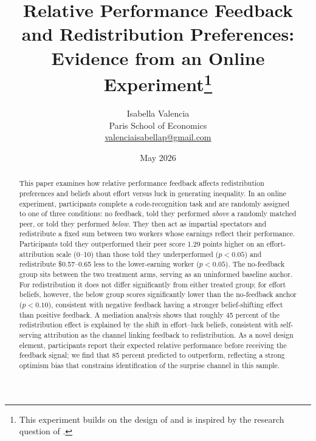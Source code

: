 \documentclass[12pt]{article}
\begin{document}
\title{\textbf{Relative Performance Feedback and Redistribution Preferences:
Evidence from an Online Experiment}\thanks{
This experiment builds on the design of \citet{Almas2020} and is inspired
by the research question of \citet{Cassar2019}.}}

\author{Isabella Valencia\\
\small Paris School of Economics\\
\small \href{mailto:valenciaisabellap@gmail.com}{valenciaisabellap@gmail.com}}

\date{May 2026}

\maketitle

\begin{abstract}
\noindent
This paper examines how relative performance feedback affects redistribution
preferences and beliefs about effort versus luck in generating inequality.
In an online experiment, participants complete a code-recognition task and
are randomly assigned to one of three conditions: no feedback, told they
performed \emph{above} a randomly matched peer, or told they performed
\emph{below}.
They then act as impartial spectators and redistribute a fixed sum between
two workers whose earnings reflect their performance.
Participants told they outperformed their peer score 1.29 points higher on
an effort-attribution scale (0--10) than those told they underperformed
($p < 0.05$) and redistribute \$0.57--0.65 less to the lower-earning worker
($p < 0.05$).
The no-feedback group sits between the two treatment arms, serving as an
uninformed baseline anchor.
For redistribution it does not differ significantly from either treated group;
for effort beliefs, however, the below group scores significantly lower than
the no-feedback anchor ($p < 0.10$), consistent with negative feedback having
a stronger belief-shifting effect than positive feedback.
A mediation analysis shows that roughly 45 percent of the redistribution
effect is explained by the shift in effort--luck beliefs, consistent with
self-serving attribution as the channel linking feedback to redistribution.
As a novel design element, participants report their expected relative
performance before receiving the feedback signal; we find that 85 percent
predicted to outperform, reflecting a strong optimism bias that constrains
identification of the surprise channel in this sample.
\end{abstract}
\end{document}

